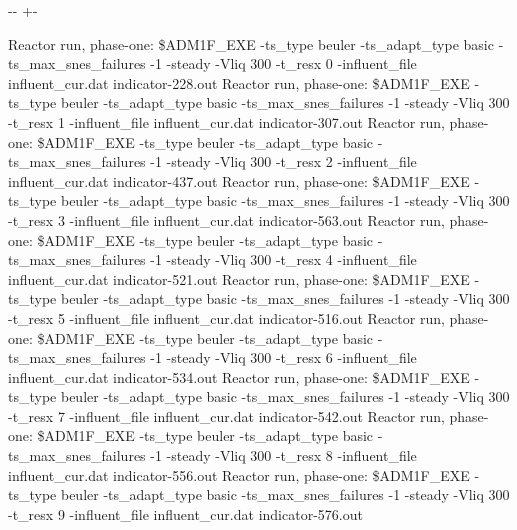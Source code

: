 \documentclass[a4paper,10pt,english]{sphinxmanual}
\newlength\nbsphinxcodecellspacing
\begin{document}
{

\kern-\sphinxverbatimsmallskipamount\kern-\baselineskip
\kern+\FrameHeightAdjust\kern-\fboxrule
\vspace{\nbsphinxcodecellspacing}

\begin{sphinxVerbatim}[commandchars=\\\{\}]
Reactor run, phase-one:
\$ADM1F\_EXE -ts\_type beuler -ts\_adapt\_type basic -ts\_max\_snes\_failures -1 -steady -Vliq 300 -t\_resx 0 -influent\_file influent\_cur.dat
indicator-228.out
Reactor run, phase-one:
\$ADM1F\_EXE -ts\_type beuler -ts\_adapt\_type basic -ts\_max\_snes\_failures -1 -steady -Vliq 300 -t\_resx 1 -influent\_file influent\_cur.dat
indicator-307.out
Reactor run, phase-one:
\$ADM1F\_EXE -ts\_type beuler -ts\_adapt\_type basic -ts\_max\_snes\_failures -1 -steady -Vliq 300 -t\_resx 2 -influent\_file influent\_cur.dat
indicator-437.out
Reactor run, phase-one:
\$ADM1F\_EXE -ts\_type beuler -ts\_adapt\_type basic -ts\_max\_snes\_failures -1 -steady -Vliq 300 -t\_resx 3 -influent\_file influent\_cur.dat
indicator-563.out
Reactor run, phase-one:
\$ADM1F\_EXE -ts\_type beuler -ts\_adapt\_type basic -ts\_max\_snes\_failures -1 -steady -Vliq 300 -t\_resx 4 -influent\_file influent\_cur.dat
indicator-521.out
Reactor run, phase-one:
\$ADM1F\_EXE -ts\_type beuler -ts\_adapt\_type basic -ts\_max\_snes\_failures -1 -steady -Vliq 300 -t\_resx 5 -influent\_file influent\_cur.dat
indicator-516.out
Reactor run, phase-one:
\$ADM1F\_EXE -ts\_type beuler -ts\_adapt\_type basic -ts\_max\_snes\_failures -1 -steady -Vliq 300 -t\_resx 6 -influent\_file influent\_cur.dat
indicator-534.out
Reactor run, phase-one:
\$ADM1F\_EXE -ts\_type beuler -ts\_adapt\_type basic -ts\_max\_snes\_failures -1 -steady -Vliq 300 -t\_resx 7 -influent\_file influent\_cur.dat
indicator-542.out
Reactor run, phase-one:
\$ADM1F\_EXE -ts\_type beuler -ts\_adapt\_type basic -ts\_max\_snes\_failures -1 -steady -Vliq 300 -t\_resx 8 -influent\_file influent\_cur.dat
indicator-556.out
Reactor run, phase-one:
\$ADM1F\_EXE -ts\_type beuler -ts\_adapt\_type basic -ts\_max\_snes\_failures -1 -steady -Vliq 300 -t\_resx 9 -influent\_file influent\_cur.dat
indicator-576.out
\end{sphinxVerbatim}
}
\end{document}

